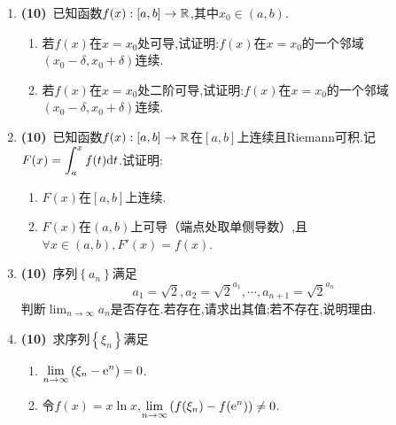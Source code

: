 \documentclass{ctexart}
\begin{document}
\begin{enumerate}[leftmargin=*,label=\textbf{\arabic*.},topsep=0pt,parsep=0pt,itemsep=0pt,partopsep=0pt]
    \item \textbf{(10)}\ 已知函数$f(x):[a,b]\to\mathbb{R}$,其中$x_0\in(a,b)$.
        \begin{enumerate}[label=\textbf{(\arabic*)}]
            \item 若$f(x)$在$x=x_0$处可导,试证明:$f(x)$在$x=x_0$的一个邻域$(x_0-\delta,x_0+\delta)$连续.
            \item 若$f(x)$在$x=x_0$处二阶可导,试证明:$f(x)$在$x=x_0$的一个邻域$(x_0-\delta,x_0+\delta)$连续.
        \end{enumerate}

    \item \textbf{(10)}\ 已知函数$f(x):[a,b]\to\mathbb{R}$在$[a,b]$上连续且Riemann可积.记$\displaystyle F(x)=\int_a^xf(t)\mathrm{d} t$.试证明:
        \begin{enumerate}[label=\textbf{(\arabic*)}]
            \item $F(x)$在$[a,b]$上连续.
            \item $F(x)$在$(a,b)$上可导（端点处取单侧导数）,且$\forall x\in(a,b),F'(x)=f(x)$.
        \end{enumerate}

    \item \textbf{(10)}\ 序列$\left\{a_n\right\}$满足
        $$a_1=\sqrt{2},a_2=\sqrt{2}^{a_1},\cdots,a_{n+1}=\sqrt{2}^{a_n}$$
        判断$\displaystyle\lim_{n\to\infty}a_n$是否存在.若存在,请求出其值;若不存在,说明理由.

    \item \textbf{(10)}\ 求序列$\left\{\xi_n\right\}$满足
        \begin{enumerate}[label=\textbf{(\alph*)}]
            \item $\displaystyle\lim_{n\to\infty}\left(\xi_n-\mathrm{e}^n\right)=0$.
            \item 令$f(x)=x\ln x$,$\displaystyle\lim_{n\to\infty}{\left(f(\xi_n)-f(\mathrm{e}^n)\right)}\neq0$.
        \end{enumerate}
\end{enumerate}
\end{document}

